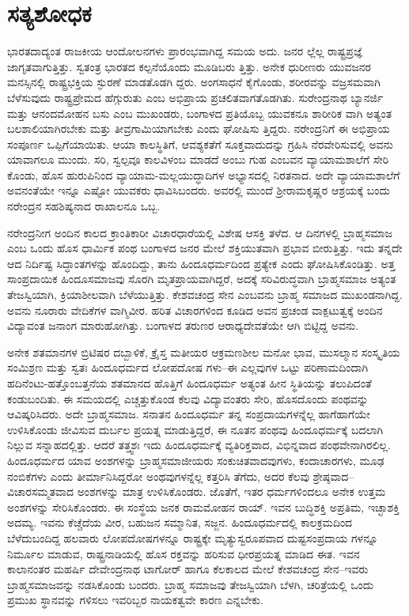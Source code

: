 
\chapter{ಸತ್ಯಶೋಧಕ}

\noindent

ಭಾರತದಾದ್ಯಂತ ರಾಜಕೀಯ ಆಂದೋಲನಗಳು ಪ್ರಾರಂಭವಾಗಿದ್ದ ಸಮಯ ಅದು. ಜನರ ಲ್ಲೆಲ್ಲ ರಾಷ್ಟ್ರಪ್ರಜ್ಞೆ ಜಾಗೃತವಾಗುತ್ತಿತ್ತು. ಸ್ವತಂತ್ರ ಭಾರತದ ಕಲ್ಪನೆಯೊಂದು ಮೂಡಿಬರು ತ್ತಿತ್ತು. ಅನೇಕ ಧುರೀಣರು ಯುವಜನರ ಮನಸ್ಸಿನಲ್ಲಿ ರಾಷ್ಟ್ರಭಕ್ತಿಯ ಸ್ಫುರಣೆ ಮಾಡತೊಡಗಿ ದ್ದರು. ಅಂಗಸಾಧನೆ ಕೈಗೊಂಡು, ಶರೀರವನ್ನು ವಜ್ರಸಮವಾಗಿ ಬೆಳೆಸುವುದು ರಾಷ್ಟ್ರಪ್ರೇಮದ ಹೆಗ್ಗುರುತು ಎಂಬ ಅಭಿಪ್ರಾಯ ಪ್ರಚಲಿತವಾಗತೊಡಗಿತು. ಸುರೇಂದ್ರನಾಥ ಬ್ಯಾನರ್ಜಿ ಮತ್ತು ಆನಂದಮೋಹನ ಬಸು ಎಂಬ ಮುಖಂಡರು, ಬಂಗಾಳದ ಪ್ರತಿಯೊಬ್ಬ ಯುವಕನೂ ಶಾರೀರಿಕ ವಾಗಿ ಅತ್ಯಂತ ಬಲಶಾಲಿಯಾಗಿರಬೇಕು ಮತ್ತು ತೀವ್ರಗಾಮಿಯಾಗಬೇಕು ಎಂದು ಘೋಷಿಸು ತ್ತಿದ್ದರು. ನರೇಂದ್ರನಿಗೆ ಈ ಅಭಿಪ್ರಾಯ ಸಂಪೂರ್ಣ ಒಪ್ಪಿಗೆಯಾಯಿತು. ಆಯಾ ಕಾಲಸ್ಥಿತಿಗೆ, ಆವಶ್ಯಕತೆಗೆ ಸೂಕ್ತವಾದುದನ್ನು ಗ್ರಹಿಸಿ ನೆರವೇರಿಸುವಲ್ಲಿ ಅವನು ಯಾವಾಗಲೂ ಮುಂದು. ಸರಿ, ಸ್ವಲ್ಪವೂ ಕಾಲವಿಳಂಬ ಮಾಡದೆ ಅಂಬು ಗುಹ ಎಂಬವನ ವ್ಯಾಯಾಮಶಾಲೆಗೆ ಸೇರಿ ಕೊಂಡು, ಹೊಸ ಹುರುಪಿನಿಂದ ವ್ಯಾಯಾಮ-ಮಲ್ಲಯುದ್ಧಾದಿಗಳ ಅಭ್ಯಾಸದಲ್ಲಿ ನಿರತನಾದ. ಅದೇ ವ್ಯಾಯಾಮಶಾಲೆಗೆ ಅವನಂತೆಯೇ ಇನ್ನೂ ಎಷ್ಟೋ ಯುವಕರು ಧಾವಿಸಿಬಂದರು. ಅವರಲ್ಲಿ ಮುಂದೆ ಶ್ರೀರಾಮಕೃಷ್ಣರ ಆಶ್ರಯಕ್ಕೆ ಬಂದು ನರೇಂದ್ರನ ಸಹಶಿಷ್ಯನಾದ ರಾಖಾಲನೂ ಒಬ್ಬ.

ನರೇಂದ್ರನೀಗ ಅಂದಿನ ಕಾಲದ ಕ್ರಾಂತಿಕಾರೀ ವಿಚಾರಧಾರೆಯಲ್ಲಿ ವಿಶೇಷ ಆಸಕ್ತಿ ತಳೆದ. ಆ ದಿನಗಳಲ್ಲಿ ಬ್ರಾಹ್ಮಸಮಾಜ ಎಂಬ ಒಂದು ಹೊಸ ಧಾರ್ಮಿಕ ಪಂಥ ಬಂಗಾಳದ ಜನರ ಮೇಲೆ ಶಕ್ತಿಯುತವಾಗಿ ಪ್ರಭಾವ ಬೀರುತ್ತಿತ್ತು. ಇದು ತನ್ನದೇ ಆದ ನಿರ್ದಿಷ್ಟ ಸಿದ್ಧಾಂತಗಳನ್ನು ಹೊಂದಿದ್ದು, ತಾನು ಹಿಂದೂಧರ್ಮದಿಂದ ಪ್ರತ್ಯೇಕ ಎಂದು ಘೋಷಿಸಿಕೊಂಡಿತ್ತು. ಅತ್ತ ಸಾಂಪ್ರದಾಯಿಕ ಹಿಂದೂಸಮಾಜವು ಸೊರಗಿ ಮೃತಪ್ರಾಯವಾಗಿದ್ದರೆ, ಅದಕ್ಕೆ ಸರಿವಿರುದ್ಧವಾಗಿ ಬ್ರಾಹ್ಮಸಮಾಜ ಅತ್ಯಂತ ತೇಜಸ್ವಿಯಾಗಿ, ಕ್ರಿಯಾಶೀಲವಾಗಿ ಬೆಳೆಯುತ್ತಿತ್ತು. ಕೇಶವಚಂದ್ರ ಸೇನ ಎಂಬವನು ಬ್ರಾಹ್ಮ ಸಮಾಜದ ಮುಖಂಡನಾಗಿದ್ದ. ಅವನು ನೂರಾರು ವೇದಿಕೆಗಳ ವಾಗ್ಮಿವೀರ. ಹರಿತ ವಿಚಾರಗಳಿಂದ ಕೂಡಿದ ಅವನ ಪ್ರಚಂಡ ವಾಕ್ಪಟುತ್ವಕ್ಕೆ ಅಂದಿನ ವಿದ್ಯಾವಂತ ಜನಾಂಗ ಮಾರುಹೋಗಿತ್ತು. ಬಂಗಾಳದ ತರುಣರ ಆರಾಧ್ಯದೇವತೆಯೇ ಆಗಿ ಬಿಟ್ಟಿದ್ದ ಅವನು.

ಅನೇಕ ಶತಮಾನಗಳ ಬ್ರಿಟಿಷರ ದಬ್ಬಾಳಿಕೆ, ಕ್ರೈಸ್ತ ಮತೀಯರ ಆಕ್ರಮಣಶೀಲ ಮನೋ ಭಾವ, ಮುಸಲ್ಮಾನ ಸಂಸ್ಕೃತಿಯ ಸಂಮಿಶ್ರಣ ಮತ್ತು ಸ್ವತಃ ಹಿಂದೂಧರ್ಮದ ಲೋಪದೋಷ ಗಳು–ಈ ಎಲ್ಲವುಗಳ ಒಟ್ಟು ಪರಿಣಾಮದಿಂದಾಗಿ ಹದಿನೆಂಟು-ಹತ್ತೊಂಬತ್ತನೆಯ ಶತಮಾನದ ಹೊತ್ತಿಗೆ ಹಿಂದೂಧರ್ಮ ಅತ್ಯಂತ ಹೀನ ಸ್ಥಿತಿಯನ್ನು ತಲುಪಿದಂತೆ ಕಂಡುಬಂದಿತು. ಈ ಸಮಯದಲ್ಲಿ ಎಚ್ಚತ್ತುಕೊಂಡ ಕೆಲವು ವಿದ್ಯಾವಂತರು ಸೇರಿ, ಹೊಸದೊಂದು ಪಂಥವನ್ನು ಆವಿಷ್ಕರಿಸಿದರು. ಅದೇ ಬ್ರಾಹ್ಮಸಮಾಜ. ಸನಾತನ ಹಿಂದೂಧರ್ಮ ತನ್ನ ಸಂಪ್ರದಾಯಗಳನ್ನೆಲ್ಲ ಹಾಗೆಹಾಗೆಯೇ ಉಳಿಸಿಕೊಂಡು ಜೀವಿಸುವ ದುರ್ಬಲ ಪ್ರಯತ್ನ ಮಾಡುತ್ತಿದ್ದರೆ, ಈ ನೂತನ ಪಂಥವು ಹಿಂದೂಧರ್ಮಕ್ಕೆ ಬದಲಾಗಿ ನಿಲ್ಲುವ ಸನ್ನಾಹದಲ್ಲಿತ್ತು. ಆದರೆ ತತ್ತ್ವಶಃ ಇದು ಹಿಂದೂಧರ್ಮಕ್ಕೆ ವ್ಯತಿರಿಕ್ತವಾದ, ವಿಭಿನ್ನವಾದ ಪಂಥವೇನಾಗಿರಲಿಲ್ಲ. ಹಿಂದೂಧರ್ಮದ ಯಾವ ಅಂಶಗಳನ್ನು ಬ್ರಾಹ್ಮಸಮಾಜೀಯರು ಸಂಕುಚಿತವಾದವುಗಳು, ಕಂದಾಚಾರಗಳು, ಮೂಢ ನಂಬಿಕೆಗಳು ಎಂದು ತೀರ್ಮಾನಿಸಿದ್ದರೋ ಅಂಥವುಗಳನ್ನೆಲ್ಲ ಕತ್ತರಿಸಿ ತೆಗೆದು, ಅದರ ಕೆಲವು ಶ್ರೇಷ್ಠವಾದ–ವಿಚಾರಸಮ್ಮತವಾದ ಅಂಶಗಳನ್ನು ಮಾತ್ರ ಉಳಿಸಿಕೊಂಡರು. ಜೊತೆಗೆ, ಇತರ ಧರ್ಮಗಳಿಂದಲೂ ಅನೇಕ ಉತ್ತಮ ಅಂಶಗಳನ್ನು ಸೇರಿಸಿಕೊಂಡರು. ಈ ಸಂಸ್ಥೆಯ ಜನಕ ರಾಮಮೋಹನ ರಾಯ್. ಇವನ ಬುದ್ಧಿಶಕ್ತಿ ಅಪ್ರತಿಮ, ಇಚ್ಛಾಶಕ್ತಿ ಅದಮ್ಯ. ಇವನು ಕೆಚ್ಚೆದೆಯ ವೀರ, ಬಹುಜನ ಸಮ್ಮಾನಿತ, ಸಜ್ಜನ. ಹಿಂದೂಧರ್ಮದಲ್ಲಿ ಕಾಲಕ್ರಮದಿಂದ ಬೆಳೆದುಬಂದಿದ್ದ ಹಲವಾರು ಲೋಪದೋಷಗಳನ್ನೂ ರಾಷ್ಟ್ರಕ್ಕೇ ಮೃತ್ಯುಸ್ವರೂಪವಾದ ದುಷ್ಟಸಂಪ್ರದಾಯ ಗಳನ್ನೂ ನಿರ್ಮೂಲ ಮಾಡುವ, ರಾಷ್ಟ್ರನಾಡಿಯಲ್ಲಿ ಹೊಸ ರಕ್ತವನ್ನು ಹರಿಸುವ ಧೀರಪ್ರಯತ್ನ ಮಾಡಿದ ಈತ. ಇವನ ಕಾಲಾನಂತರ ಮಹರ್ಷಿ ದೇವೇಂದ್ರನಾಥ ಟಾಗೋರ್ ಹಾಗೂ ಕೆಲಕಾಲದ ಮೇಲೆ ಕೇಶವಚಂದ್ರ ಸೇನ–ಇವರು ಬ್ರಾಹ್ಮಸಮಾಜವನ್ನು ನಡಸಿಕೊಂಡು ಬಂದರು. ಬ್ರಾಹ್ಮ ಸಮಾಜವು ತೇಜಸ್ವಿಯಾಗಿ ಬೆಳಗಿ, ಚರಿತ್ರೆಯಲ್ಲಿ ಒಂದು ಪ್ರಮುಖ ಸ್ಥಾನವನ್ನು ಗಳಿಸಲು ಇವರಿಬ್ಬರ ನಾಯಕತ್ವವೇ ಕಾರಣ ಎನ್ನಬೇಕು.


